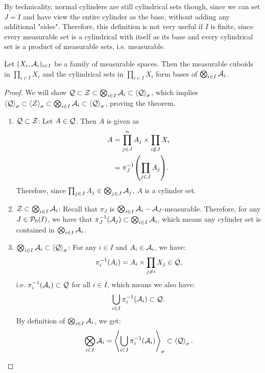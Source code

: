 \newpar
By technicality, normal cylinders are still cylindrical sets though, since we can set $J = I$ and have view the entire cylinder as the base, without adding any additional "sides". 
\newpar
Therefore, this definition is not very useful if $I$ is finite, since every measurable set is a cylindrical with itself as its base and every cylindrical set is a product of measurable sets, i.e. measurable.
\begin{importanttheorem}{}{}
	Let $(X_i, \mathcal{A}_i)_{i \in I}$ be a family of measurable spaces. Then the measurable cuboids in $\prod_{i \in I} X_i$ and the cylindrical sets in $\prod_{i \in I} X_i$ form bases of $\bigotimes_{i \in I} \mathcal{A}_i$.
\end{importanttheorem}
\begin{proof}
	We will show $\mathcal{Q} \subset \mathcal{Z} \subset \bigotimes_{i \in I} \mathcal{A}_i \subset \left\langle \mathcal{Q} \right\rangle_\sigma$, which implies $ \left\langle \mathcal{Q} \right\rangle_\sigma \subset \left\langle \mathcal{Z} \right\rangle_\sigma \subset \bigotimes_{i \in I} \mathcal{A}_i \subset \left\langle \mathcal{Q} \right\rangle_\sigma$, proving the theorem.
	\begin{enumerate}
		\item $\mathcal{Q} \subset \mathcal{Z}$: Let $A \in \mathcal{Q}$. Then $A$ is given as
		\begin{align*}
			A 
			&= \prod_{j \in J}^n A_j \times \prod_{i \notin J} X_i\\
			&= \pi_J^{-1}\qty(\prod_{j \in J} A_j).
		\end{align*}
		Therefore, since $\prod_{j \in J} A_j \in \bigotimes_{j \in J} \mathcal{A}_j$, $A$ is a cylinder set.
		\item $\mathcal{Z} \subset \bigotimes_{i \in I} \mathcal{A}_i$: Recall that $\pi_J$ is $\bigotimes_{i \in I} \mathcal{A}_i-\mathcal{A}_J$-measurable. Therefore, for any $J \in \mathcal{P}_0(I)$, we have that $\pi_J^{-1}(\mathcal{A}_j) \subset \bigotimes_{i \in I} \mathcal{A}_i$, which means any cylinder set is contained in $\bigotimes_{i \in I} \mathcal{A}_i$.
		\item $\bigotimes_{i \in I} \mathcal{A}_i \subset \left\langle \mathcal{Q} \right\rangle_\sigma$: For any $i \in I$ and $A_i \in \mathcal{A}_i$, we have:
		\begin{align*}
			\pi_i^{-1}(A_i) = A_i \times \prod_{j \neq i} X_j \in \mathcal{Q},
		\end{align*}
		i.e. $\pi_i^{-1}(\mathcal{A}_i) \subset \mathcal{Q}$ for all $i \in I$, which means we also have:
		\begin{align*}
			\bigcup_{i \in I} \pi_i^{-1}(\mathcal{A}_i) \subset \mathcal{Q}.
		\end{align*}
		By definition of $\bigotimes_{i \in I} \mathcal{A}_i$, we get:
		\begin{align*}
			\bigotimes_{i \in I} \mathcal{A}_i  = \left\langle \bigcup_{i \in I} \pi_i^{-1}(\mathcal{A}_i) \right\rangle_\sigma \subset \left\langle \mathcal{Q} \right\rangle_\sigma.
		\end{align*}
	\end{enumerate}
\end{proof}
\clearpage


